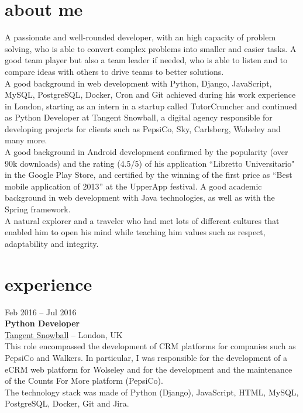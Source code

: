 \documentclass[]{friggeri-cv} %
\begin{document}
\section{about me}
{
	A passionate and well-rounded developer, with an high capacity of problem solving, who is able to convert complex problems into smaller and easier tasks. A good team player but also a team leader if needed, who is able to listen and to compare ideas with others to drive teams to better solutions. \\
	A good background in web development with Python, Django, JavaScript, MySQL, PostgreSQL, Docker, Cron and Git achieved during his work experience in London, starting as an intern in a startup called TutorCruncher and continued as Python Developer at Tangent Snowball, a digital agency responsible for developing projects for clients such as PepsiCo, Sky, Carlsberg, Wolseley and many more. \\
	A good background in Android development confirmed by the popularity (over 90k downloads) and the rating (4.5/5) of his application “Libretto Universitario" in the Google Play Store, and certified by the winning of the first price as “Best mobile application of 2013” at the UpperApp festival. A good academic background in web development with Java technologies, as well as with the Spring framework.
	\\
	A natural explorer and a traveler who had met lots of different cultures that enabled him to open his mind while teaching him values such as respect, adaptability and integrity.
}


\section{experience}

{Feb 2016 -- Jul 2016} \\
{\textbf{Python Developer}} \\
{\href{http://www.tangentsnowball.com}{Tangent Snowball}} -- {London, UK} \\
{This role encompassed the development of CRM platforms for companies such as PepsiCo and Walkers. In particular, I was responsible for the development of a eCRM web platform for Wolseley and for the development and the maintenance of the Counts For More platform (PepsiCo). \\
The technology stack was made of Python (Django), JavaScript, HTML, MySQL, PostgreSQL, Docker, Git and Jira.}
\end{document}
